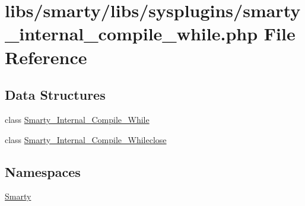 \hypertarget{smarty__internal__compile__while_8php}{}\section{libs/smarty/libs/sysplugins/smarty\+\_\+internal\+\_\+compile\+\_\+while.php File Reference}
\label{smarty__internal__compile__while_8php}
\subsection*{Data Structures}
\begin{DoxyCompactItemize}
\item 
class \hyperlink{class_smarty___internal___compile___while}{Smarty\+\_\+\+Internal\+\_\+\+Compile\+\_\+\+While}
\item 
class \hyperlink{class_smarty___internal___compile___whileclose}{Smarty\+\_\+\+Internal\+\_\+\+Compile\+\_\+\+Whileclose}
\end{DoxyCompactItemize}
\subsection*{Namespaces}
\begin{DoxyCompactItemize}
\item 
 \hyperlink{namespace_smarty}{Smarty}
\end{DoxyCompactItemize}
